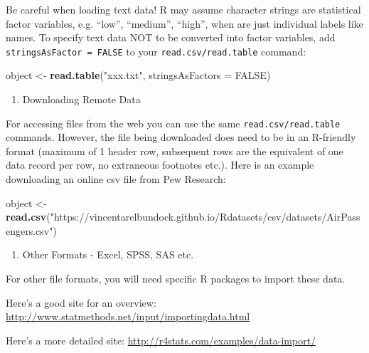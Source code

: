 \documentclass[]{book}
\newenvironment{Shaded}{\begin{snugshade}}{\end{snugshade}}
\newcommand{\DataTypeTok}[1]{\textcolor[rgb]{0.13,0.29,0.53}{#1}}
\newcommand{\KeywordTok}[1]{\textcolor[rgb]{0.13,0.29,0.53}{\textbf{#1}}}
\newcommand{\NormalTok}[1]{#1}
\newcommand{\OtherTok}[1]{\textcolor[rgb]{0.56,0.35,0.01}{#1}}
\newcommand{\StringTok}[1]{\textcolor[rgb]{0.31,0.60,0.02}{#1}}
\providecommand{\tightlist}{%
  \setlength{\itemsep}{0pt}\setlength{\parskip}{0pt}}
\begin{document}
Be careful when loading text data! R may assume character strings are statistical factor variables, e.g. ``low'', ``medium'', ``high'', when are just individual labels like names. To specify text data NOT to be converted into factor variables, add \texttt{stringsAsFactor\ =\ FALSE} to your \texttt{read.csv/read.table} command:

\begin{Shaded}
\begin{Highlighting}[]
\NormalTok{object <-}\StringTok{ }\KeywordTok{read.table}\NormalTok{(}\StringTok{"xxx.txt"}\NormalTok{, }\DataTypeTok{stringsAsFactors =} \OtherTok{FALSE}\NormalTok{)}
\end{Highlighting}
\end{Shaded}

\begin{enumerate}
\def\labelenumi{\arabic{enumi}.}
\setcounter{enumi}{2}
\tightlist
\item
  Downloading Remote Data
\end{enumerate}

For accessing files from the web you can use the same \texttt{read.csv/read.table} commands. However, the file being downloaded does need to be in an R-friendly format (maximum of 1 header row, subsequent rows are the equivalent of one data record per row, no extraneous footnotes etc.). Here is an example downloading an online csv file from Pew Research:

\begin{Shaded}
\begin{Highlighting}[]
\NormalTok{object <-}\StringTok{ }\KeywordTok{read.csv}\NormalTok{(}\StringTok{"https://vincentarelbundock.github.io/Rdatasets/csv/datasets/AirPassengers.csv"}\NormalTok{)}
\end{Highlighting}
\end{Shaded}

\begin{enumerate}
\def\labelenumi{\arabic{enumi}.}
\setcounter{enumi}{3}
\tightlist
\item
  Other Formats - Excel, SPSS, SAS etc.
\end{enumerate}

For other file formats, you will need specific R packages to import these data.

Here's a good site for an overview: \url{http://www.statmethods.net/input/importingdata.html}

Here's a more detailed site: \url{http://r4stats.com/examples/data-import/}
\end{document}
